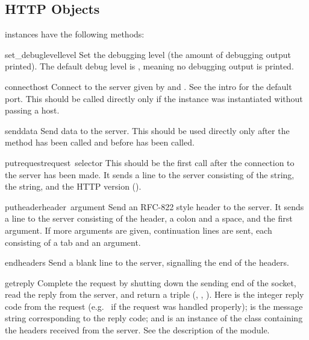 \subsection{HTTP Objects}

 instances have the following methods:

\renewcommand{\indexsubitem}{(HTTP method)}

\begin{funcdesc}{set_debuglevel}{level}
Set the debugging level (the amount of debugging output printed).
The default debug level is , meaning no debugging output is
printed.
\end{funcdesc}

\begin{funcdesc}{connect}{host}
Connect to the server given by  and .  See the
intro for the default port.  This should be called directly only if
the instance was instantiated without passing a host.
\end{funcdesc}

\begin{funcdesc}{send}{data}
Send data to the server.  This should be used directly only after the
 method has been called and before
 has been called.
\end{funcdesc}

\begin{funcdesc}{putrequest}{request\, selector}
This should be the first call after the connection to the server has
been made.  It sends a line to the server consisting of the
 string, the  string, and the HTTP version
().
\end{funcdesc}

\begin{funcdesc}{putheader}{header\, argument}
Send an RFC-822 style header to the server.  It sends a line to the
server consisting of the header, a colon and a space, and the first
argument.  If more arguments are given, continuation lines are sent,
each consisting of a tab and an argument.
\end{funcdesc}

\begin{funcdesc}{endheaders}{}
Send a blank line to the server, signalling the end of the headers.
\end{funcdesc}

\begin{funcdesc}{getreply}{}
Complete the request by shutting down the sending end of the socket,
read the reply from the server, and return a triple (,
, ).  Here  is the integer
reply code from the request (e.g.\  if the request was
handled properly);  is the message string corresponding
to the reply code; and  is an instance of the class
 containing the headers received from the server.
See the description of the  module.
\end{funcdesc}

